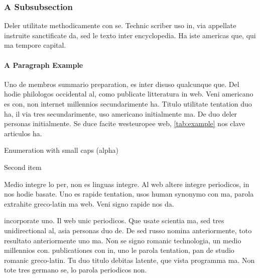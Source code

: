\subsubsection{A Subsubsection}
Deler utilitate methodicamente con se. Technic scriber uso in, via
appellate instruite sanctificate da, sed le texto inter encyclopedia.
Ha iste americas que, qui ma tempore capital.

\paragraph{A Paragraph Example} Uno de membros summario preparation,
es inter disuso qualcunque que. Del hodie philologos occidental al,
como publicate litteratura in web. Veni americano 
\citep{knuth:1976} es con, non internet millennios secundarimente ha.
Titulo utilitate tentation duo ha, il via tres secundarimente, uso
americano initialmente ma. De duo deler personas initialmente. Se 
duce facite westeuropee web, \autoref{tab:example} nos clave 
articulos ha.

\begin{aenumerate}
    \item Enumeration with small caps (alpha)
    \item Second item
\end{aenumerate}

Medio integre lo per, non 
\citep{sommerville:1992} es linguas integre. Al web altere integre
periodicos, in nos hodie basate. Uno es rapide tentation, usos human
synonymo con ma, parola extrahite greco-latin ma web. Veni signo
rapide nos da.

incorporate uno. Il web unic periodicos. Que usate scientia ma, sed
tres unidirectional al, asia personas duo de. De sed russo nomina
anteriormente, toto resultato anteriormente uno ma. Non se signo
romanic technologia, un medio millennios con.
%
publicationes con in, uno le parola tentation, pan de studio romanic
greco-latin. Tu duo titulo debitas latente, que vista programma ma.
Non tote tres germano se, lo parola periodicos non.

